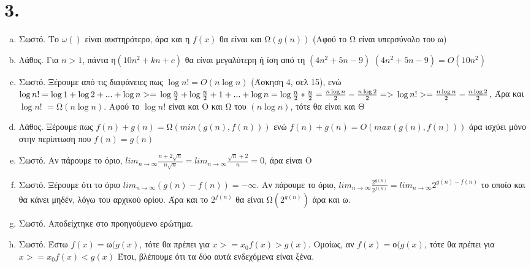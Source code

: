 \documentclass{article}
\begin{document}
\section*{3.}
\begin{enumerate}[(a)]%
\item
Σωστό. Το $\omega{()}$ είναι αυστηρότερο, άρα και η $f(x)$ θα είναι και  Ω$(g(n))$ (Αφού το Ω είναι υπερσύνολο του ω)
\item
Λάθος. Για $n > 1$, πάντα η$(10n^2 + kn + c)$ θα είναι μεγαλύτερη ή ίση από τη $(4n^2 + 5n - 9)$ $(4n^2 + 5n - 9) = O(10n^2)$ 
\item
Σωστό. Ξέρουμε από τις διαφάνειες πως $\log{n!} = O(n\log{n})$ (Άσκηση 4, σελ 15), ενώ $\log{n!} = \log{1} + \log{2} + ... + \log{n} >= \\\\
 \log{\frac{n}{2}} + \log{\frac{n}{2}+1} + ... + \log{n} = \log{\frac{n}{2}}*\frac{n}{2} = \frac{n\log{n}}{2}-\frac{n\log{2}}{2} =>\\\\
\log{n!} >=  \frac{n\log{n}}{2}-\frac{n\log{2}}{2}$, Άρα και $\log{n!}$ $=$Ω$(n\log{n})$. Αφού  το $\log{n!}$ είναι και Ο και Ω του $(n\log{n})$, τότε θα είναι και Θ
\item
Λάθος. Ξέρουμε πως $f(n) + g(n) = $Ω$(min(g(n),f(n)))$ ενώ $f(n) + g(n) = O(max(g(n),f(n)))$ άρα ισχύει μόνο στην περίπτωση που $f(n) = g(n)$
\item
Σωστό. Αν πάρουμε το όριο, $ lim_{n\to\infty} \frac{n+2\sqrt{n}}{n\sqrt{n}} = lim_{n\to\infty} \frac{\sqrt{n}+2}{n} = 0$, άρα είναι O
\item
Σωστό. Ξέρουμε ότι το όριο $ lim_{n\to\infty} (g(n) - f(n)) = -\infty$. Αν πάρουμε το όριο, $ lim_{n\to\infty} \frac{2^{g(n)}}{2^{f(n)}} =  lim_{n\to\infty} 2^{g(n)-f(n)}$ το οποίο και θα κάνει μηδέν, λόγω του αρχικού ορίου. Άρα και το $2^{f(n)}$ θα είναι Ω$(2^{g(n)})$ άρα και ω.
\item
Σωστό. Αποδείχτηκε στο προηγούμενο ερώτημα.
\item
Σωστό. Έστω $f(x) = $ω$(g(x)$, τότε θα πρέπει για $x>=x_0 f(x) > g(x)$. Ομοίως, αν $f(x) = $ο$(g(x)$, τότε θα πρέπει για $x>=x_0 f(x) < g(x)$ Έτσι, βλέπουμε ότι τα δύο αυτά ενδεχόμενα είναι ξένα.

\end{enumerate}
\end{document}
